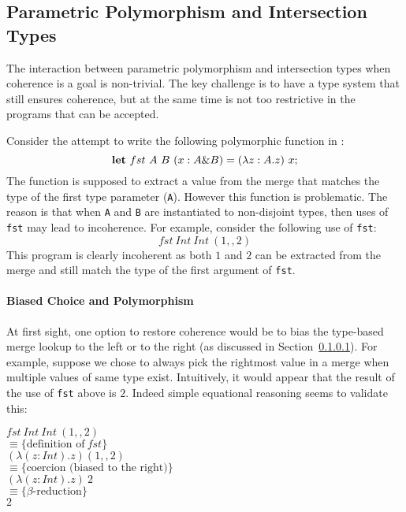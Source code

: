 \subsection{Parametric Polymorphism and Intersection Types}\label{subsec:polymorphism}
The interaction between parametric polymorphism and
intersection types when coherence is a goal is non-trivial. 
The key challenge is to have a type
system that still ensures coherence, but at the same time is not too
restrictive in the programs that can be accepted. 
\begin{comment}
Dunfield~\cite{} provides a
good illustrative example of the issues that arize when combining
disjoint intersection types and parametric polymorphism:
\[\lambda x. {\bf let}~y = 0 \mergeop x~{\bf in}~x\]
\end{comment}
Consider the attempt to write 
the following polymorphic function in \name:
\[{\bf let}~fst~A~B~(x : A \& B) = (\lambda z : A. z)~x;\] The
 function is supposed to extract a value from the merge that
matches the type of the first type parameter (\lstinline{A}).  However
this function is problematic.  The reason is that when
\lstinline{A} and \lstinline{B} are instantiated to non-disjoint
types, then uses of \lstinline{fst} may lead to incoherence.
For example, consider the following use of \lstinline{fst}:
\[fst~Int~Int~(1,,2)\]
\noindent This program is clearly incoherent as both 
$1$ and $2$ can be extracted from the merge and still match the type
of the first argument of \lstinline{fst}.

\paragraph{Biased Choice and Polymorphism} At first sight, one option 
to restore coherence would be to bias the type-based merge lookup 
to the left or to the right (as discussed in
Section~\ref{}). For example, suppose we chose to always pick the
rightmost value in a merge when multiple values of same type exist.
Intuitively, it would appear that the result of the use of
\lstinline{fst} above is $2$. Indeed simple equational reasoning
seems to validate this:

\vspace{5pt}
\noindent$fst~Int~Int~(1,,2)$\\
$\equiv\{\text{definition of}~fst\}$\\
$(\lambda (z : Int). z) (1,,2)$\\
$\equiv\{\text{coercion (biased to the right)}\}$\\
$(\lambda (z : Int). z)~2$\\
$\equiv\{\beta\text{-reduction}\}$\\
$2$
\vspace{5pt}

